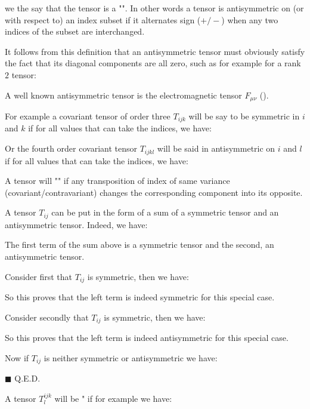 	we the say that the tensor is a "\label{antisymmetric tensor}".  In other words a tensor is antisymmetric on (or with respect to) an index subset if it alternates sign ($+/-$) when any two indices of the subset are interchanged.
	
	It follows from this definition that an antisymmetric tensor must obviously satisfy the fact that its diagonal components are all zero, such as for example for a rank $2$ tensor:
	
	
	A well known antisymmetric tensor is the electromagnetic tensor $F_{\mu \nu }$ ().
	
	For example a covariant tensor of order three $T_{ijk}$ will be say to be symmetric in $i$ and $k$ if for all values that can take the indices, we have:
	
	Or the fourth order covariant tensor $T_{ijkl}$ will be said in antisymmetric on $i$ and $l$ if for all values that can take the indices, we have:
	 
	
	A tensor will "" if any transposition of index of same variance (covariant/contravariant) changes the corresponding component into its opposite.

	\label{decomposition square matrix symmetric and antisymmetric} A tensor $T_{ij}$ can be put in the form of a sum of a symmetric tensor and an antisymmetric tensor. Indeed, we have:
	
	The first term of the sum above is a symmetric tensor and the second, an antisymmetric tensor.
	\begin{dem}
	Consider first that $T_{ij}$ is symmetric, then we have:
	
	So this proves that the left term is indeed symmetric for this special case.
	
	Consider secondly that $T_{ij}$ is symmetric, then we have:
	
	So this proves that the left term is indeed antisymmetric for this special case.

	Now if $T_{ij}$ is neither symmetric or antisymmetric we have:
	
	\begin{flushright}
		$\blacksquare$  Q.E.D.
	\end{flushright}
	\end{dem}
	A tensor $T_l^{ijk}$ will be " if for example we have:
	
